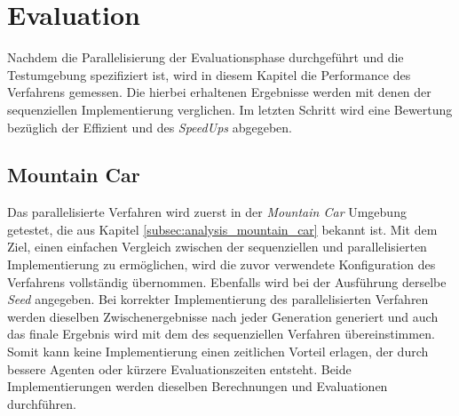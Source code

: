 \section{Evaluation}
Nachdem die Parallelisierung der Evaluationsphase durchgeführt und die Testumgebung spezifiziert ist, wird in diesem Kapitel die Performance des Verfahrens gemessen. Die hierbei erhaltenen Ergebnisse werden mit denen der sequenziellen Implementierung verglichen. Im letzten Schritt wird eine Bewertung bezüglich der Effizient und des \emph{SpeedUps} abgegeben.

\subsection{Mountain Car}
Das parallelisierte Verfahren wird zuerst in der \emph{Mountain Car} Umgebung getestet, die aus Kapitel \ref{subsec:analysis_mountain_car} bekannt ist. Mit dem Ziel, einen einfachen Vergleich zwischen der sequenziellen und parallelisierten Implementierung zu ermöglichen, wird die zuvor verwendete Konfiguration des Verfahrens vollständig übernommen. Ebenfalls wird bei der Ausführung derselbe \emph{Seed} angegeben. Bei korrekter Implementierung des parallelisierten Verfahren werden dieselben Zwischenergebnisse nach jeder Generation generiert und auch das finale Ergebnis wird mit dem des sequenziellen Verfahren übereinstimmen. Somit kann keine Implementierung einen zeitlichen Vorteil erlagen, der durch bessere Agenten oder kürzere Evaluationszeiten entsteht. Beide Implementierungen werden dieselben Berechnungen und Evaluationen durchführen.
